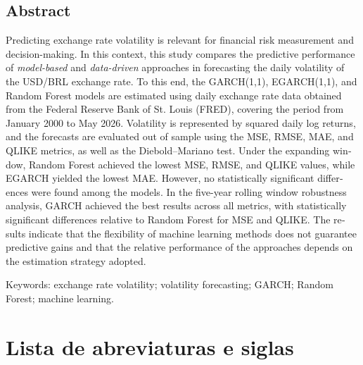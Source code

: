 \documentclass[12pt,a4paper,oneside,openany]{report}
\makeatletter
\def\cleardoublepage{\clearpage\if@twoside\ifodd\c@page\else
  \thispagestyle{empty}\hbox{}\newpage\fi\fi}
\makeatother
\begin{document}
\cleardoublepage
\begin{otherlanguage}{english}
\chapter*{Abstract}
\begin{singlespace}\noindent
Predicting exchange rate volatility is relevant for financial risk measurement and decision-making. In this context, this study compares the 
predictive performance of \textit{model-based} and \textit{data-driven} approaches in forecasting the daily volatility of the USD/BRL exchange rate. To this end, 
the GARCH(1,1), EGARCH(1,1), and Random Forest models are estimated using daily exchange rate data obtained from the Federal Reserve Bank of St. 
Louis (FRED), covering the period from January 2000 to May 2026. Volatility is represented by squared daily log returns, and the forecasts are 
evaluated out of sample using the MSE, RMSE, MAE, and QLIKE metrics, as well as the Diebold–Mariano test. Under the expanding window, Random Forest 
achieved the lowest MSE, RMSE, and QLIKE values, while EGARCH yielded the lowest MAE. However, no statistically significant differences were found 
among the models. In the five-year rolling window robustness analysis, GARCH achieved the best results across all metrics, with statistically 
significant differences relative to Random Forest for MSE and QLIKE. The results indicate that the flexibility of machine learning methods does not 
guarantee predictive gains and that the relative performance of the approaches depends on the estimation strategy adopted.
\par\vspace{\baselineskip}
\noindent Keywords: exchange rate volatility; volatility forecasting; GARCH; Random Forest; machine learning.
\end{singlespace}
\end{otherlanguage}

\cleardoublepage
\chapter*{Lista de abreviaturas e siglas}
\end{document}

